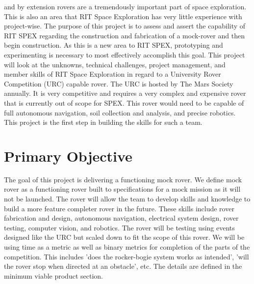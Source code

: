 \documentclass[conference]{IEEEtran} %
\begin{document}
  and by extension rovers are a tremendously important
part of space exploration. 
This is also an area that RIT
Space Exploration has very little experience with project-wise.
The purpose of this project is to assess and assert the capability
of RIT SPEX regarding the construction and fabrication of a mock-rover and then begin construction. 
As this is a new area to RIT SPEX, prototyping and experimenting is necessary to most effectively accomplish this goal. 
This project will look at the unknowns, technical challenges, project management, and member skills of RIT Space Exploration in regard to a University Rover Competition (URC) capable rover. 
The URC is hosted by The Mars Society annually. 
It is very competitive and requires a very complex and expensive rover that is currently out of scope for SPEX. 
This rover would need to be capable of full autonomous navigation, soil collection and analysis, and precise robotics. 
This project is the first step in building the skills for such a team.


\section{Primary Objective}
\label{sec:primary-obj}

The goal of this project is delivering a functioning mock rover.
We define mock rover as a functioning rover built to specifications
for a mock mission as it will not be launched. The rover
will allow the team to develop skills and knowledge to build a
more feature completer rover in the future. These skills include
rover fabrication and design, autonomous navigation, electrical
system design, rover testing, computer vision, and robotics.
The rover will be testing using events designed like
the URC but scaled down to fit the scope of this rover. We
will be using time as a metric as well as binary metrics for
completion of the parts of the competition. This includes ’does
the rocker-bogie system works as intended’, ’will the rover stop
when directed at an obstacle’, etc. The details are defined in
the minimum viable product section.
\end{document}
